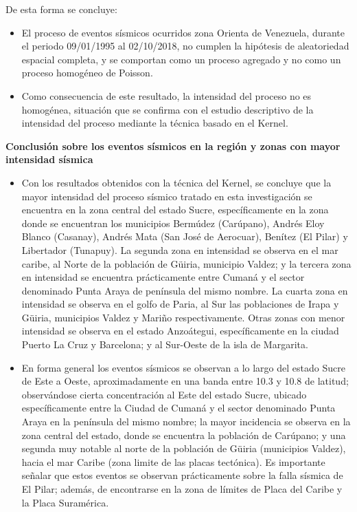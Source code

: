 \documentclass[12pt]{report}
\begin{document}
{{{{{{{{{{{{{{{  De esta forma se concluye:\\	
	\begin{itemize}	
\item   El proceso de eventos sísmicos ocurridos zona Orienta de Venezuela, durante el periodo  09/01/1995 al  02/10/2018, no cumplen la hipótesis de aleatoriedad espacial completa,  y se comportan como un proceso agregado y no como un proceso homogéneo de Poisson.

\item  Como consecuencia  de este resultado, la intensidad del proceso no es  homogénea, situación que se confirma con el estudio descriptivo de la intensidad del proceso mediante la técnica basado en el Kernel.\\    
\end{itemize} 

  \textbf{Conclusión sobre los eventos sísmicos en la región y zonas con mayor intensidad sísmica}\\

 
 
\begin{itemize}
 
\item   Con los resultados obtenidos con la técnica del Kernel, se concluye que la mayor intensidad del proceso sísmico tratado en esta investigación se encuentra en la zona central del estado Sucre, específicamente en la zona donde se encuentran los municipios Bermúdez (Carúpano),  Andrés Eloy Blanco (Casanay),  Andrés Mata (San José de Aerocuar), Benítez (El Pilar) y Libertador (Tunapuy). La segunda zona en intensidad se observa en el mar caribe, al Norte de la población de Güiria,  municipio Valdez; y la tercera zona en intensidad se encuentra prácticamente entre Cumaná y el sector denominado Punta Araya de península del mismo nombre.  La cuarta zona en intensidad se observa en el golfo de Paria, al Sur las poblaciones de  Irapa y  Güiria, municipios Valdez y  Mariño respectivamente. Otras zonas con menor intensidad se observa en el estado Anzoátegui, específicamente en la ciudad Puerto La Cruz y Barcelona; y al Sur-Oeste de la isla de Margarita.\\

  
 
\item   En forma general los eventos sísmicos se observan a lo largo del estado Sucre de Este a Oeste, aproximadamente en una banda entre 10.3 y 10.8 de latitud; observándose cierta concentración al Este del estado Sucre, ubicado específicamente entre la Ciudad de Cumaná y el sector denominado Punta Araya en la península del mismo nombre;  la mayor  incidencia se observa en la zona central del estado, donde se encuentra la población de Carúpano; y una segunda muy notable al norte de la población de Güiria (municipios Valdez), hacia el mar Caribe (zona limite de las placas tectónica). Es importante señalar que estos eventos se observan prácticamente  sobre la falla sísmica  de El Pilar; además, de encontrarse en la zona de límites de Placa del Caribe y la Placa Suramérica. \\
 

\end{itemize}}}}}}}}}}}}}}}}
\end{document}
